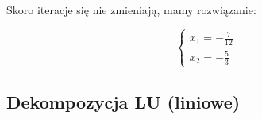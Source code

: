 \documentclass{article}
\begin{document}
Skoro iteracje się nie zmieniają, mamy rozwiązanie:

\begin{equation*}\begin{cases}
    x_1=-\frac{7}{12}\\
    x_2=-\frac{5}{3}
\end{cases}\end{equation*}

\subsection{Dekompozycja LU (liniowe)}
\end{document}
